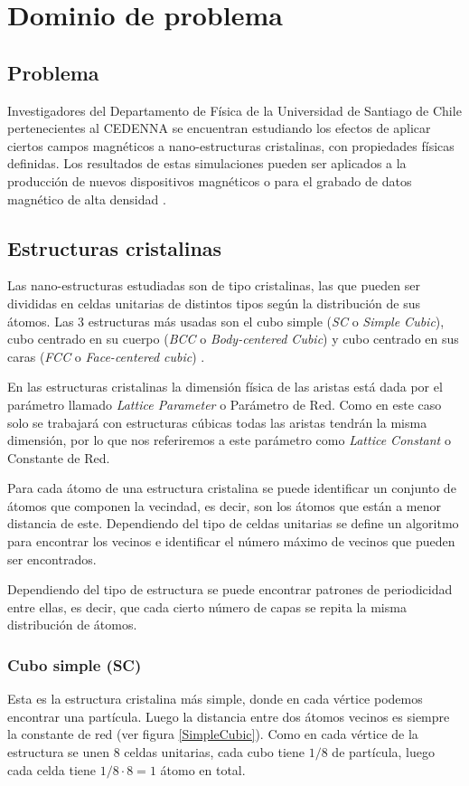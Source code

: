 \chapter{Dominio de problema}
\label{cap:dominio}

\section{Problema}
Investigadores del Departamento de Física de la Universidad de Santiago de Chile pertenecientes al CEDENNA se encuentran estudiando los efectos de aplicar ciertos campos magnéticos a nano-estructuras cristalinas, con propiedades físicas definidas. Los resultados de estas simulaciones pueden ser aplicados a la producción de nuevos dispositivos magnéticos o para el grabado de datos magnético de alta densidad  \citep{asymmetricMagneticDots}.

\section{Estructuras cristalinas}
Las nano-estructuras estudiadas son de tipo cristalinas, las que pueden ser divididas en celdas unitarias de distintos tipos  según la distribución de sus átomos. Las 3 estructuras más usadas son el cubo simple (\emph{SC} o \emph{Simple Cubic}), cubo centrado en su cuerpo (\emph{BCC} o \emph{Body-centered Cubic}) y cubo centrado en sus caras (\emph{FCC} o \emph{Face-centered cubic}) \citep{ITC213}.

En las estructuras cristalinas la dimensión física de las aristas está dada por el parámetro llamado \emph{Lattice Parameter} o Parámetro de Red. Como en este caso solo se trabajará con estructuras cúbicas todas las aristas tendrán la misma dimensión, por lo que nos referiremos a este parámetro como \emph{Lattice Constant} o Constante de Red.

Para cada átomo de una estructura cristalina se puede identificar un conjunto de átomos que componen la vecindad, es decir, son los átomos que están a menor distancia de este. Dependiendo del tipo de celdas unitarias se define un algoritmo para encontrar los vecinos e identificar el número máximo de vecinos que pueden ser encontrados.

Dependiendo del tipo de estructura se puede encontrar patrones de periodicidad entre ellas, es decir, que cada cierto número de capas se repita la misma distribución de átomos.

\subsection{Cubo simple (SC)}
\label{structureSC}
Esta es la estructura cristalina más simple, donde en cada vértice podemos encontrar una partícula. Luego la distancia entre dos átomos vecinos es siempre la constante de red (ver figura \ref{SimpleCubic}). Como en cada vértice de la estructura se unen 8 celdas unitarias, cada cubo tiene $1/8$ de partícula, luego cada celda tiene $1/8 \cdot 8 = 1$ átomo en total.


